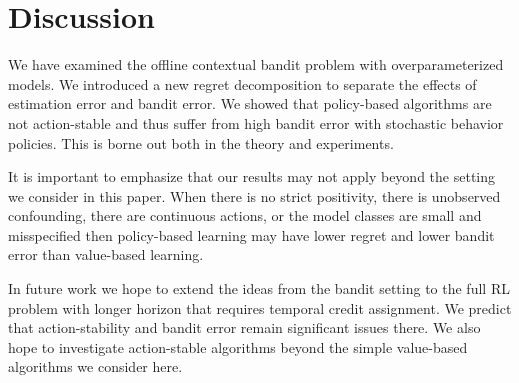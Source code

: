 




\section{Discussion}
We have examined the offline contextual bandit problem with overparameterized models. We introduced a new regret decomposition to separate the effects of estimation error and bandit error. We showed that policy-based algorithms are not action-stable and thus suffer from high bandit error with stochastic behavior policies.
This is borne out both in the theory and experiments.

It is important to emphasize that our results may not apply beyond the setting we consider in this paper. When there is no strict positivity, there is unobserved confounding, there are continuous actions, or the model classes are small and misspecified then policy-based learning may have lower regret and lower bandit error than value-based learning.

In future work we hope to extend the ideas from the bandit setting to the full RL problem with longer horizon that requires temporal credit assignment. We predict that action-stability and bandit error remain significant issues there.
We also hope to investigate action-stable algorithms beyond the simple value-based algorithms we consider here.


\printendnotes

